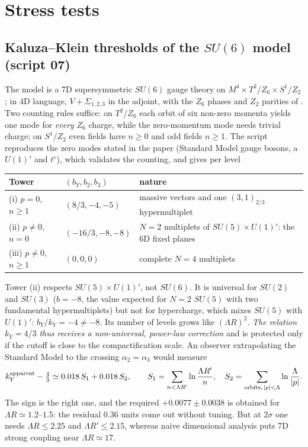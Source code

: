 \documentclass[11pt,a4paper]{article}
\newcommand{\kY}{k_Y}
\begin{document}
\section{Stress tests}

\subsection{Kaluza--Klein thresholds of the \texorpdfstring{$SU(6)$}{SU(6)} model (script 07)}
The model is a 7D supersymmetric $SU(6)$ gauge theory on $M^4\times T^2/Z_6\times S^1/Z_2$; in 4D language, $V+\Sigma_{1,2,3}$ in
the adjoint, with the $Z_6$ phases and $Z_2$ parities of \cite{BJLL2}. Two counting rules suffice: on $T^2/Z_6$ each orbit of six
non-zero momenta yields one mode for \emph{every} $Z_6$ charge, while the zero-momentum mode needs trivial charge; on $S^1/Z_2$
even fields have $n\ge0$ and odd fields $n\ge1$. The script reproduces the zero modes stated in the paper (Standard Model gauge
bosons, a $U(1)'$ and $t^c$), which validates the counting, and gives per level
\begin{center}\begin{tabular}{lll}\toprule
Tower & $(b_Y,b_2,b_3)$ & nature\\\midrule
(i) $p=0$, $n\ge1$ & $(8/3,-4,-5)$ & massive vectors and one $(3,1)_{2/3}$ hypermultiplet\\
(ii) $p\ne0$, $n=0$ & $(-16/3,-8,-8)$ & $N{=}2$ multiplets of $SU(5)\times U(1)'$: the 6D fixed planes\\
(iii) $p\ne0$, $n\ge1$ & $(0,0,0)$ & complete $N{=}4$ multiplets\\\bottomrule
\end{tabular}\end{center}
Tower (ii) respects $SU(5)\times U(1)'$, not $SU(6)$. It is universal for $SU(2)$ and $SU(3)$ ($b=-8$, the value expected for
$N{=}2$ $SU(5)$ with two fundamental hypermultiplets) but not for hypercharge, which mixes $SU(5)$ with $U(1)'$:
$b_Y/\kY=-4\ne-8$. Its number of levels grows like $(\Lambda R)^2$. \emph{The relation $\kY=4/3$ thus receives a non-universal,
power-law correction} and is protected only if the cutoff is close to the compactification scale. An observer extrapolating the
Standard Model to the crossing $\alpha_2=\alpha_3$ would measure
\begin{equation}
\kY^{\rm apparent}-\tfrac43\simeq0.018\,S_1+0.018\,S_2,\qquad S_1=\sum_{n<\Lambda R'}\ln\frac{\Lambda R'}{n},\quad
S_2=\sum_{\text{orbits},\,|p|<\Lambda}\ln\frac{\Lambda}{|p|}.
\end{equation}
The sign is the right one, and the required $+0.0077\pm0.0038$ is obtained for $\Lambda R\simeq1.2$--$1.5$: the residual
$0.36$ units come out without tuning. But at $2\sigma$ one needs $\Lambda R\le2.25$ and $\Lambda R'\le2.15$, whereas naive
dimensional analysis puts 7D strong coupling near $\Lambda R\simeq17$.
\end{document}
